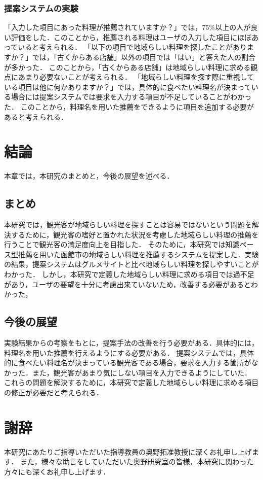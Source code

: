 \documentclass{funthesis}
\begin{document}
\subsection{提案システムの実験}
「入力した項目にあった料理が推薦されていますか？」では，75\%以上の人が良い評価をした．このことから，推薦される料理はユーザの入力した項目にほぼあっていると考えられる．
「以下の項目で地域らしい料理を探したことがありますか？」では，「古くからある店舗」以外の項目では「はい」と答えた人の割合が多かった．
このことから，「古くからある店舗」は地域らしい料理に求める観点にあまり必要ないことが考えられる．
「地域らしい料理を探す際に重視している項目は他に何かありますか？」では，具体的に食べたい料理名が決まっている場合には提案システムでは要求を入力する項目が不足していることがわかった．
このことから，料理名を用いた推薦をできるように項目を追加する必要があると考えられる．

\chapter{結論}
本章では，本研究のまとめと，今後の展望を述べる．

\section{まとめ}
本研究では，観光客が地域らしい料理を探すことは容易ではないという問題を解決するために，観光客の嗜好と置かれた状況を考慮した地域らしい料理の推薦を行うことで観光客の満足度向上を目指した．
そのために，本研究では知識ベース型推薦を用いた函館市の地域らしい料理を推薦するシステムを提案した．実験の結果，提案システムはグルメサイトと比べ地域らしい料理を探しやすいことがわかった．
しかし，本研究で定義した地域らしい料理に求める項目では過不足があり，ユーザの要望を十分に考慮出来ていないため，改善する必要があるとわかった，

\section{今後の展望}
実験結果からの考察をもとに，提案手法の改善を行う必要がある．具体的には，料理名を用いた推薦を行えるようにする必要がある．
提案システムでは，具体的に食べたい料理名が決まっている観光客である場合，要求を入力する箇所がなかった．また，観光客があまり気にしない項目を入力できるようにしていた．
これらの問題を解決するために，本研究で定義した地域らしい料理に求める項目の修正が必要だと考えられる．

\chapter *{謝辞}
本研究にあたりご指導いただいた指導教員の奥野拓准教授に深くお礼申し上げます．
また，様々な助言をしていただいた奥野研究室の皆様，本研究に関わった方々にも深くお礼申し上げます．
\end{document}
